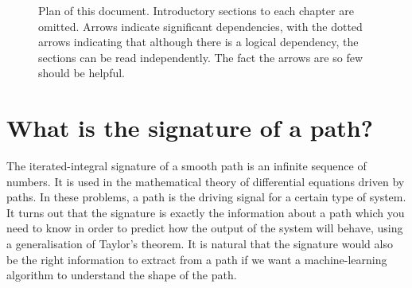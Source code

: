 \begin{figure}[h]
  \caption[Plan of this document]{Plan of this document. Introductory sections to each chapter are omitted. Arrows indicate significant dependencies, with the dotted arrows indicating that although there is a logical dependency, the sections can be read independently. The fact the arrows are so few should be helpful.}
  \label{fig:plan}
\end{figure}

\section{What is the signature of a path?}

The iterated-integral signature of a smooth path is an infinite sequence of numbers. It is used in the mathematical theory of differential equations driven by paths. In these problems, a path is the driving signal for a certain type of system. It turns out that the signature is exactly the information about a path which you need to know in order to predict how the output of the system will behave, using a generalisation of Taylor's theorem. %
It is natural that the signature would also be the right information to extract from a path if we want a machine-learning algorithm to understand the shape of the path.

